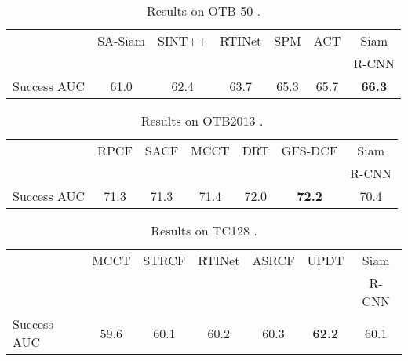 \documentclass[10pt,twocolumn,letterpaper]{article}
\begin{document}
\begin{table}[t]
\centering{}\setlength{\tabcolsep}{2pt}
\footnotesize
\begin{tabular}{lcccccc}
\toprule
 & {\footnotesize{}SA-Siam} & {\footnotesize{}SINT++} & {\footnotesize{}RTINet} & {\footnotesize{}SPM} & {\footnotesize{}ACT} & {\footnotesize{}Siam}\tabularnewline
 & {\footnotesize{}\cite{He18CVPR_Twofold}} & {\footnotesize{}\cite{Wang18CVPR_Adversarial}} & {\footnotesize{}\cite{Yao18ECCV}} & {\footnotesize{}\cite{wang2019spm}} & {\footnotesize{}\cite{Chen18ECCV_Actor}} & {\footnotesize{}R-CNN} \tabularnewline 
\midrule
Success AUC & {\footnotesize{}61.0} & {\footnotesize{}62.4} & {\footnotesize{}63.7} & {\footnotesize{}65.3} & {\footnotesize{}65.7} & {\footnotesize{}\textbf{66.3}}\tabularnewline
\bottomrule
\end{tabular}
\caption{\label{tab:otb50}Results on OTB-50 \cite{Wu15TPAMI}.}
\end{table}
 \begin{table}[t]
\centering{}\setlength{\tabcolsep}{2pt}
\footnotesize
\begin{tabular}{lcccccc}
\toprule
 & {\footnotesize{}RPCF} & {\footnotesize{}SACF} & {\footnotesize{}MCCT} & {\footnotesize{}DRT} & {\footnotesize{}GFS-DCF} & {\footnotesize{}Siam}\tabularnewline
 & {\footnotesize{}\cite{Sun19CVPR}} & {\footnotesize{}\cite{Zhang18ECCV_Aligned}} & {\footnotesize{}\cite{Wang18CVPR}} & {\footnotesize{}\cite{Sun18CVPR_Reliability}} & {\footnotesize{}\cite{Xu19ICCV}} & {\footnotesize{}R-CNN} \tabularnewline 
\midrule
Success AUC & {\footnotesize{}71.3} & {\footnotesize{}71.3} & {\footnotesize{}71.4} & {\footnotesize{}72.0} & {\footnotesize{}\textbf{72.2}} & {\footnotesize{}70.4}\tabularnewline
\bottomrule
\end{tabular}
\caption{\label{tab:otb2013}Results on OTB2013 \cite{Wu13CVPR}.}
\end{table}
 \begin{table}[t]
\centering{}\setlength{\tabcolsep}{2pt}
\footnotesize
\begin{tabular}{lcccccc}
\toprule
 & {\footnotesize{}MCCT} & {\footnotesize{}STRCF} & {\footnotesize{}RTINet} & {\footnotesize{}ASRCF} & {\footnotesize{}UPDT} & {\footnotesize{}Siam}\tabularnewline
 & {\footnotesize{}\cite{Wang18CVPR}} & {\footnotesize{}\cite{Li18CVPR_Regularized}} & {\footnotesize{}\cite{Yao18ECCV}} & {\footnotesize{}\cite{Dai19CVPR}} & {\footnotesize{}\cite{Bhat18ECCV}} & {\footnotesize{}R-CNN} \tabularnewline 
\midrule
Success AUC & {\footnotesize{}59.6} & {\footnotesize{}60.1} & {\footnotesize{}60.2} & {\footnotesize{}60.3} & {\footnotesize{}\textbf{62.2}} & {\footnotesize{}60.1}\tabularnewline
\bottomrule
\end{tabular}
\caption{\label{tab:tc128}Results on TC128 \cite{Liang15TIP}.}
\end{table}
\end{document}
